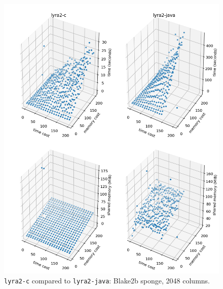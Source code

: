 \begin{figure}[H]
    \centering
    \includegraphics[width=\linewidth]{figures/tcost_mcost_blake2b_2048}
    \caption{\texttt{lyra2-c} compared to \texttt{lyra2-java}: Blake2b sponge, 2048 columns.}
    \label{figure:tcost_mcost_blake2b_2048}
\end{figure}

